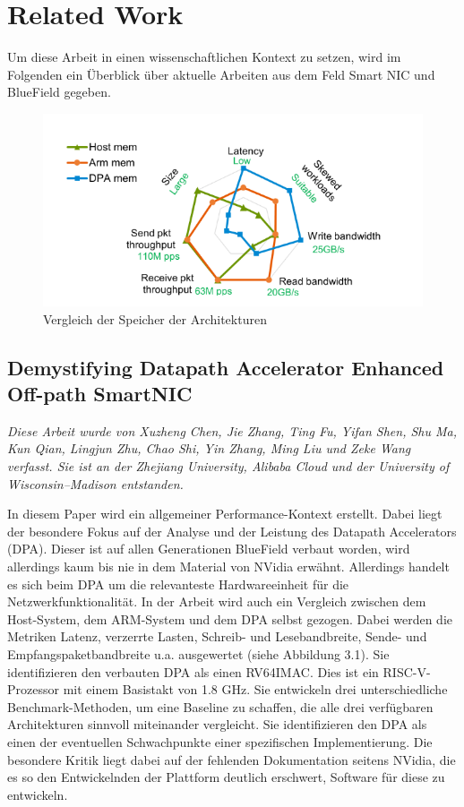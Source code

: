 \chapter{Related Work}
Um diese Arbeit in einen wissenschaftlichen Kontext zu setzen, wird im Folgenden ein Überblick über aktuelle Arbeiten aus dem Feld Smart NIC und BlueField gegeben.
\begin{figure}
    \centering
    \includegraphics[width=0.7\linewidth]{images/DPARam.png}
    \caption{Vergleich der Speicher der Architekturen \cite{chen2024demystifying}}
    \label{fig:enter-label}
\end{figure}
\section{Demystifying Datapath Accelerator Enhanced Off-path SmartNIC}
\textit{Diese Arbeit wurde von Xuzheng Chen, Jie Zhang, Ting Fu, Yifan Shen, Shu Ma, Kun Qian, Lingjun Zhu, Chao Shi, Yin Zhang, Ming Liu und Zeke Wang verfasst. Sie ist an der Zhejiang University, Alibaba Cloud und der University of Wisconsin–Madison entstanden.}

In diesem Paper wird ein allgemeiner Performance-Kontext erstellt. Dabei liegt der besondere Fokus auf der Analyse und der Leistung des Datapath Accelerators (DPA). Dieser ist auf allen Generationen BlueField verbaut worden, wird allerdings kaum bis nie in dem Material von NVidia erwähnt. Allerdings handelt es sich beim DPA um die relevanteste Hardwareeinheit für die Netzwerkfunktionalität. In der Arbeit wird auch ein Vergleich zwischen dem Host-System, dem ARM-System und dem DPA selbst gezogen. Dabei werden die Metriken Latenz, verzerrte Lasten, Schreib- und Lesebandbreite, Sende- und Empfangspaketbandbreite u.a. ausgewertet (siehe Abbildung 3.1). Sie identifizieren den verbauten DPA als einen RV64IMAC. Dies ist ein RISC-V-Prozessor mit einem Basistakt von 1.8 GHz. Sie entwickeln drei unterschiedliche Benchmark-Methoden, um eine Baseline zu schaffen, die alle drei verfügbaren Architekturen sinnvoll miteinander vergleicht. Sie identifizieren den DPA als einen der eventuellen Schwachpunkte einer spezifischen Implementierung. Die besondere Kritik liegt dabei auf der fehlenden Dokumentation seitens NVidia, die es so den Entwickelnden der Plattform deutlich erschwert, Software für diese zu entwickeln.

